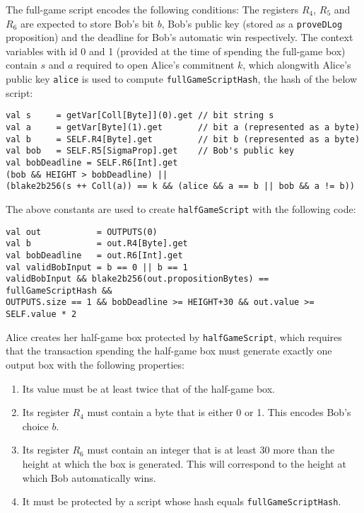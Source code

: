 \documentclass[11pt]{article}
\newcommand{\langname}{ErgoScript\xspace}
\begin{document}
The full-game script encodes the following conditions: The registers $R_4$, $R_5$ and $R_6$ are expected to store Bob's bit $b$, Bob's public key (stored as a \texttt{proveDLog} proposition) and the deadline for Bob's automatic win respectively. The context variables with id 0 and 1 (provided at the time of spending the full-game box) contain $s$ and $a$ required to open Alice's commitnent $k$, which alongwith Alice's public key \texttt{alice} is used to compute \texttt{fullGameScriptHash}, the hash of the below script: 

\begin{verbatim}
val s     = getVar[Coll[Byte]](0).get // bit string s
val a     = getVar[Byte](1).get       // bit a (represented as a byte)
val b     = SELF.R4[Byte].get         // bit b (represented as a byte)
val bob   = SELF.R5[SigmaProp].get    // Bob's public key
val bobDeadline = SELF.R6[Int].get
(bob && HEIGHT > bobDeadline) || 
(blake2b256(s ++ Coll(a)) == k && (alice && a == b || bob && a != b))
\end{verbatim}
The above constants are used to create \texttt{halfGameScript} with the following code:
\begin{verbatim}
val out           = OUTPUTS(0)
val b             = out.R4[Byte].get
val bobDeadline   = out.R6[Int].get
val validBobInput = b == 0 || b == 1
validBobInput && blake2b256(out.propositionBytes) == fullGameScriptHash &&
OUTPUTS.size == 1 && bobDeadline >= HEIGHT+30 && out.value >= SELF.value * 2 
\end{verbatim}

Alice creates her half-game box protected by \texttt{halfGameScript}, which requires that the transaction spending the half-game box must generate exactly one output box with the following properties:

\begin{enumerate}
	\item Its value must be at least twice that of the half-game box.
	\item Its register $R_4$ must contain a byte that is either 0 or 1. This encodes Bob's choice $b$.
	\item Its register $R_6$ must contain an integer that is at least 30 more than the height at which the box is generated. This will correspond to the height at which Bob automatically wins.
	\item It must be protected by a script whose hash equals \texttt{fullGameScriptHash}.
\end{enumerate}
 
\end{document}
